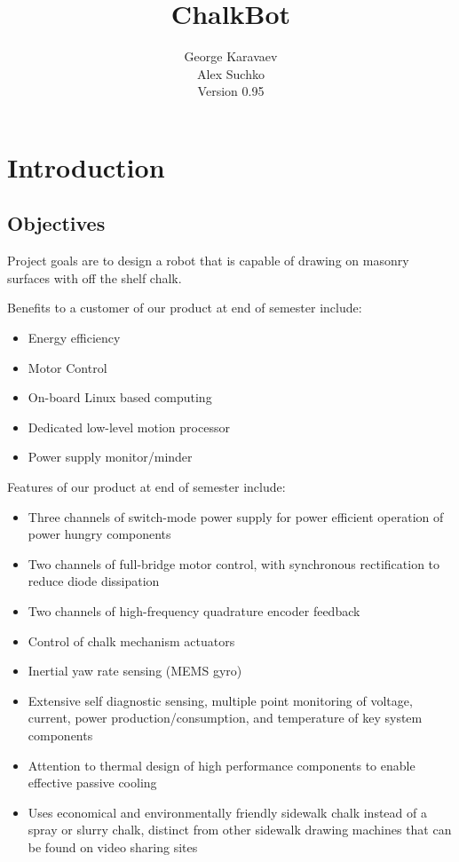 \documentclass[12pt]{article}
\title{ChalkBot}
\author{George Karavaev\\ Alex Suchko\\ \normalsize Version 0.95}
\begin{document}
  \maketitle 
 \newpage
 \tableofcontents
 \newpage
 \section{Introduction}
 \subsection{Objectives}
 Project goals are to design a robot that is capable of drawing on masonry surfaces with off the shelf chalk. 
 
 Benefits to a customer of our product at end of semester include:
 \begin{itemize}
  \item Energy efficiency
  \item Motor Control
  \item On-board Linux based computing
  \item Dedicated low-level motion processor
  \item Power supply monitor/minder
\end{itemize}
Features of our product at end of semester include:
   \begin{itemize}
  \item Three channels of switch-mode power supply for power efficient operation of power hungry components
  \item Two channels of full-bridge motor control, with synchronous rectification to reduce diode dissipation
  \item Two channels of high-frequency quadrature encoder feedback
  \item Control of chalk mechanism actuators
  \item Inertial yaw rate sensing (MEMS gyro)
  \item Extensive self diagnostic sensing, multiple point monitoring of voltage, current, power production/consumption, and temperature of key system components
  \item Attention to thermal design of high performance components to enable effective passive cooling
  \item Uses economical and environmentally friendly sidewalk chalk instead of a spray or slurry chalk, distinct from other sidewalk drawing machines that can be found on video sharing sites
\end{itemize}
  
\end{document}
